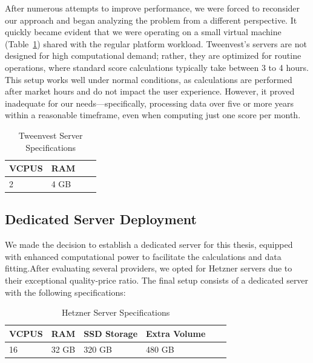 \documentclass[11pt,english,a4paper,hidelinks]{book}
\begin{document}
\vspace{0.5cm}
\noindent After numerous attempts to improve performance, we were forced to reconsider our approach and began analyzing the problem from a different perspective. It quickly became evident that we were operating on a small virtual machine (Table~\ref{tab:tweenvest_server_specs}) shared with the regular platform workload. Tweenvest's servers are not designed for high computational demand; rather, they are optimized for routine operations, where standard score calculations typically take between 3 to 4 hours. This setup works well under normal conditions, as calculations are performed after market hours and do not impact the user experience. However, it proved inadequate for our needs—specifically, processing data over five or more years within a reasonable timeframe, even when computing just one score per month.

\begin{table}[H]
    \centering
    \begin{tabular}{|l|l|l|l|}
        \hline
        \textbf{VCPUS} & \textbf{RAM}  \\
        \hline
        2 & 4 GB  \\
        \hline
    \end{tabular}
    \caption{Tweenvest Server Specifications}
    \label{tab:tweenvest_server_specs}
\end{table}


\subsection{Dedicated Server Deployment}
\noindent We made the decision to establish a dedicated server for this thesis, equipped with enhanced computational power to facilitate the calculations and data fitting.After evaluating several providers, we opted for Hetzner servers due to their exceptional quality-price ratio. The final setup consists of a dedicated server with the following specifications:

\begin{table}[H]
    \centering
    \begin{tabular}{|l|l|l|l|l|l|}
        \hline
        \textbf{VCPUS} & \textbf{RAM} & \textbf{SSD Storage} & \textbf{Extra Volume} \\
        \hline
        16 & 32 GB & 320 GB & 480 GB \\
        \hline
    \end{tabular}
    \caption{Hetzner Server Specifications}
    \label{tab:hetzner_server_specs}
\end{table}
\end{document}
